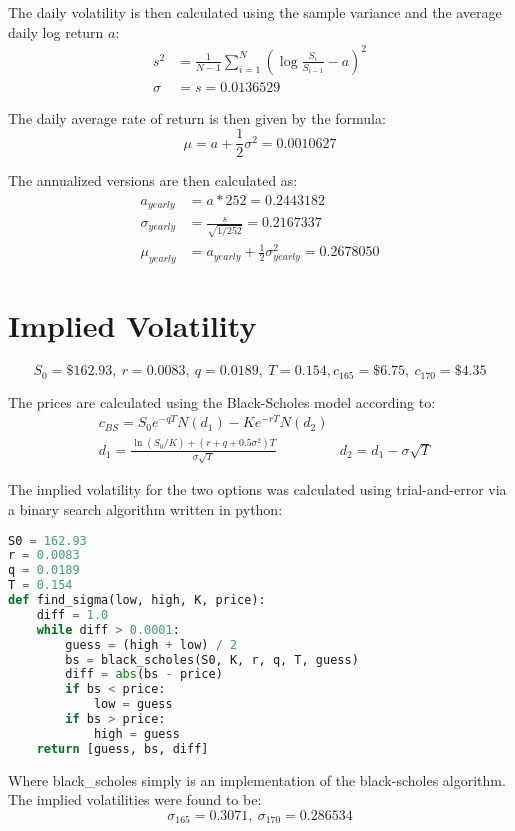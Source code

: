 \documentclass{article}
\begin{document}
The daily volatility is then calculated using the sample variance and the average daily log return $a$: 
\begin{align*}
	s^2 &= \frac{1}{N-1} \sum_{i=1}^{N}\left( \log \frac{S_i}{S_{i-1}} - a \right)^2 \\
	\sigma &= s = 0.0136529
\end{align*}

The daily average rate of return is then given by the formula:
$$\mu = a + \frac{1}{2}\sigma^2 = 0.0010627$$

The annualized versions are then calculated as:
\begin{align*}
	a_{yearly} &= a * 252 = 0.2443182\\
	\sigma_{yearly} &= \frac{s}{\sqrt{1/252}} = 0.2167337\\
	\mu_{yearly} &= a_{yearly} + \frac{1}{2}\sigma_{yearly}^2 = 0.2678050
\end{align*}


\section{Implied Volatility}

$$S_0 = \$162.93, \ r = 0.0083, \ q = 0.0189, \ T=0.154, c_{165} = \$6.75, \ c_{170} = \$4.35$$

The prices are calculated using the Black-Scholes model according to:
\begin{align*}
	&c_{BS} = S_0 e^{-qT}N(d_1) - Ke^{-rT}N(d_2) \\
	&d_1 = \frac{\ln(S_0 / K) + (r + q + 0.5\sigma^2) T}{\sigma \sqrt{T}}
	&d_2 = d_1 - \sigma \sqrt{T}
\end{align*}

The implied volatility for the two options was calculated using trial-and-error via a binary search algorithm written in python: 

\begin{lstlisting}[language=Python]
S0 = 162.93
r = 0.0083
q = 0.0189
T = 0.154
def find_sigma(low, high, K, price):
	diff = 1.0
	while diff > 0.0001:
		guess = (high + low) / 2
		bs = black_scholes(S0, K, r, q, T, guess)
		diff = abs(bs - price)
		if bs < price:
			low = guess
		if bs > price:
			high = guess
	return [guess, bs, diff]
\end{lstlisting}

Where black\_scholes simply is an implementation of the black-scholes algorithm. The implied volatilities were found to be:
$$ \sigma_{165} = 0.3071, \ \sigma_{170} = 0.286534 $$
\end{document}
